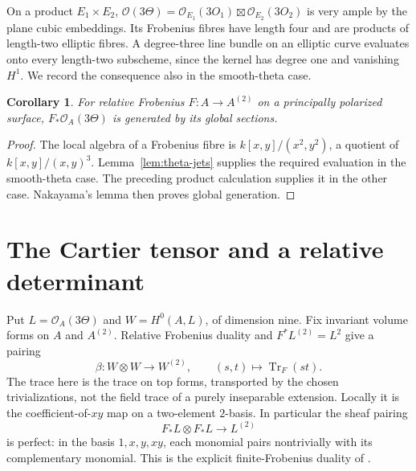 \documentclass[11pt]{article}
\newtheorem{corollary}[theorem]{Corollary}
\theoremstyle{definition}\newtheorem{definition}[theorem]{Definition}
\theoremstyle{remark}\newtheorem{remark}[theorem]{Remark}
\newcommand{\OO}{\mathcal O}
\newcommand{\Tr}{\operatorname{Tr}}
\begin{document}
On a product $E_1\times E_2$, $\OO(3\Theta)=\OO_{E_1}(3O_1)\boxtimes\OO_{E_2}(3O_2)$ is very ample by the plane cubic embeddings. Its Frobenius fibres have length four and are products of length-two elliptic fibres. A degree-three line bundle on an elliptic curve evaluates onto every length-two subscheme, since the kernel has degree one and vanishing $H^1$. We record the consequence also in the smooth-theta case.

\begin{corollary}\label{cor:fgenerated}
For relative Frobenius $F:A\to A^{(2)}$ on a principally polarized surface, $F_*\OO_A(3\Theta)$ is generated by its global sections.
\end{corollary}
\begin{proof}
The local algebra of a Frobenius fibre is $k[x,y]/(x^2,y^2)$, a quotient of $k[x,y]/(x,y)^3$. Lemma~\ref{lem:theta-jets} supplies the required evaluation in the smooth-theta case. The preceding product calculation supplies it in the other case. Nakayama's lemma then proves global generation.
\end{proof}

\section{The Cartier tensor and a relative determinant}

Put $L=\OO_A(3\Theta)$ and $W=H^0(A,L)$, of dimension nine. Fix invariant volume forms on $A$ and $A^{(2)}$. Relative Frobenius duality and $F^*L^{(2)}=L^2$ give a pairing
\begin{equation}\label{eq:beta}
 \beta:W\otimes W\longrightarrow W^{(2)},\qquad
 (s,t)\longmapsto\Tr_F(st).
\end{equation}
The trace here is the trace on top forms, transported by the chosen trivializations, not the field trace of a purely inseparable extension. Locally it is the coefficient-of-$xy$ map on a two-element $2$-basis. In particular the sheaf pairing
\begin{equation}\label{eq:perfect}
 F_*L\otimes F_*L\longrightarrow L^{(2)}
\end{equation}
is perfect: in the basis $1,x,y,xy$, each monomial pairs nontrivially with its complementary monomial. This is the explicit finite-Frobenius duality of \citet[Lemma~1.3.6, Proposition~1.3.7 and Theorem~1.3.8, pp.~26--28]{BrionKumar}.
\end{document}
